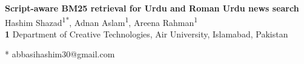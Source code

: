 \documentclass[10pt,letterpaper]{article}
\begin{document}
\vspace*{0.2in}

\begin{flushleft}
{\Large
\textbf{Script-aware {BM25} retrieval for {Urdu} and {Roman} {Urdu} news search} %
}
\newline
\\
Hashim Shazad\textsuperscript{1*},
Adnan Aslam\textsuperscript{1},
Areena Rahman\textsuperscript{1}
\\
\bigskip
\textbf{1} Department of Creative Technologies, Air University, Islamabad, Pakistan
\\
\bigskip

%
%





* abbasihashim30@gmail.com

\end{flushleft}

\end{document}
